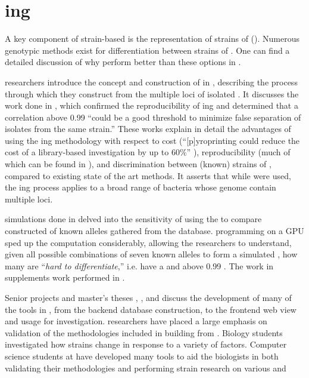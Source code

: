\section{\Pyro{}ing}
A key component of strain-based \MSTlong{} is the representation of strains of \fiblong{} (\fib{}).
Numerous genotypic methods exist for differentiation between strains of \ecoli{}. 
One can find a detailed discussion of why \pyros{} perform better than these options in \cite{kent2014pyroprinting}.

\cp{} researchers introduce the concept and construction of \pyros{} in \cite{Black2014121, kent2014pyroprinting}, describing the process through which they construct \pyros{} from the multiple loci of isolated \ecoli{} \dna{}.
It discusses the work done in \cite{Shealy:SeniorProject}, which confirmed the reproducibility of \pyro{}ing and determined that a \pearson{} correlation above 0.99 ``could be a good threshold to minimize false separation of isolates from the same strain.''
These works explain in detail the advantages of using the \pyro{}ing methodology with respect to cost (``[p]yroprinting could reduce the cost of a library-based \mst{} investigation by up to 60\%'' \cite{Black2014121}), reproducibility (much of which can be found in \cite{Shealy:SeniorProject}), and discrimination between (known) strains of \ecoli{}, compared to existing state of the art methods.
It asserts that while \ecoli{} were used, the \pyro{}ing process applies to a broad range of bacteria whose genome contain multiple loci.

\Silico{} simulations done in \cite{DBLP:conf/bibm/BrandtMSBGK12} delved into the sensitivity of using the \pearson{} \pcfunclabel{} to compare constructed \pyros{} of known \ecoli{} alleles gathered from the \ncbilong{} database.
\cuda{} programming on a GPU sped up the \pcfunclabel{} computation considerably, allowing the researchers to understand, given all possible combinations of seven known alleles to form a simulated \isol{}, how many \isols{} are ``\textit{hard to differentiate},'' i.e. have a \pcsixt{} and \pcfive{} above 0.99 \cite{DBLP:conf/bibm/BrandtMSBGK12}.
The work in \cite{DBLP:conf/bibm/BrandtMSBGK12} supplements \vitro{} work performed in \cite{DBLP:conf/bibm/MontanaDNBK11}.

Senior projects and master's theses \cite{ricketts2014cal}, \cite{soliman2013cplop}, and \cite{webb2011cplop} discuss the development of many of the tools in \cplop{}, from the backend database construction, to the frontend web view and usage for investigation.
\cp{} researchers have placed a large emphasis on validation of the methodologies included in building \pyros{} from \ecoli{} \isols{}.
Biology students investigated how \ecoli{} strains change in response to a variety of factors.
Computer science students at \cp{} have developed many tools to aid the biologists in both validating their methodologies and performing \ecoli{} strain research on various \hosts{} and \spec{}

